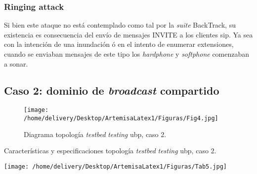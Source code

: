 \documentclass[a4paper,12pt]{report}
\begin{document}
\subsubsection{Ringing attack}

Si bien este ataque no está contemplado como tal por la \emph{suite} BackTrack, su
existencia es consecuencia del envío de mensajes INVITE a los clientes \ac{sip}. Ya
sea con la intención de una inundación ó en el intento de enumerar extensiones,
cuando se enviaban mensajes de este tipo los \emph{hardphone} y \emph{softphone}
comenzaban a sonar.

\newpage

\subsection{Caso 2: dominio de \emph{broadcast} compartido}

\begin{figure}[h!] 
\centering
\texttt{[image: /home/delivery/Desktop/ArtemisaLatex1/Figuras/Fig4.jpg]}
\caption{Diagrama topología \emph{testbed} \emph{testing} \ac{ubp}, caso 2.}
\label{caso2_topología}
\end{figure}

\begin{table}[h!]
\caption{Características y especificaciones topología \emph{testbed} \emph{testing} \ac{ubp}, caso 2.}
\centering
\texttt{[image: /home/delivery/Desktop/ArtemisaLatex1/Figuras/Tab5.jpg]}
\label{caso2_topología_tabla}
\end{table}
\end{document}
